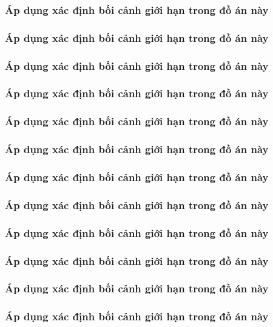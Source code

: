 \subsubsection{Áp dụng xác định bối cảnh giới hạn trong đồ án này}
\subsubsection{Áp dụng xác định bối cảnh giới hạn trong đồ án này}
\subsubsection{Áp dụng xác định bối cảnh giới hạn trong đồ án này}
\subsubsection{Áp dụng xác định bối cảnh giới hạn trong đồ án này}
\subsubsection{Áp dụng xác định bối cảnh giới hạn trong đồ án này}
\subsubsection{Áp dụng xác định bối cảnh giới hạn trong đồ án này}
\subsubsection{Áp dụng xác định bối cảnh giới hạn trong đồ án này}
\subsubsection{Áp dụng xác định bối cảnh giới hạn trong đồ án này}
\subsubsection{Áp dụng xác định bối cảnh giới hạn trong đồ án này}
\subsubsection{Áp dụng xác định bối cảnh giới hạn trong đồ án này}
\subsubsection{Áp dụng xác định bối cảnh giới hạn trong đồ án này}
\subsubsection{Áp dụng xác định bối cảnh giới hạn trong đồ án này}

